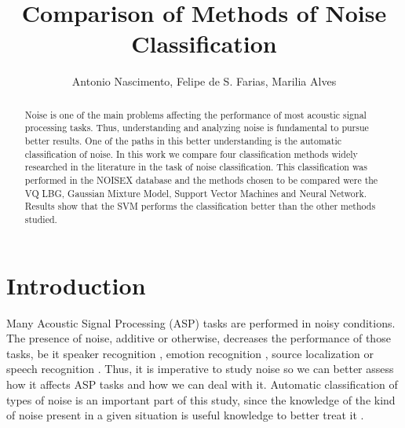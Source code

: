 \documentclass[12pt]{article}
\title{Comparison of Methods of Noise Classification}
\author{Antonio Nascimento\inst{1}, Felipe de S. Farias\inst{1}, Marilia Alves \inst{2}}
\begin{document}
 

\maketitle

\begin{abstract}


Noise is one of the main problems affecting the performance of most acoustic signal processing tasks. Thus, understanding and analyzing noise is fundamental to pursue better results. One of the paths in this better understanding is the automatic classification of noise. In this work we compare four classification methods widely researched in the literature in the task of noise classification. This classification was performed in the NOISEX database and the methods chosen to be compared were the VQ LBG, Gaussian Mixture Model, Support Vector Machines and Neural Network. Results show that the SVM performs the classification better than the other methods studied.

\end{abstract}
     


\section{Introduction} \label{sec:intro}




Many Acoustic Signal Processing (ASP) tasks are performed in noisy conditions. The presence of noise, additive or otherwise, decreases the performance of those tasks, be it speaker recognition \cite{ming2007robust}, emotion recognition \cite{schuller2010cross}, source localization \cite{benesty2000adaptive} or speech recognition \cite{friesen2001speech}. Thus, it is imperative to study noise so we can better assess how it affects ASP tasks and how we can deal with it. Automatic classification of types of noise is an important part of this study, since the knowledge of the kind of noise present in a given situation is useful knowledge to better treat it \cite{may2012noise}.
\end{document}
